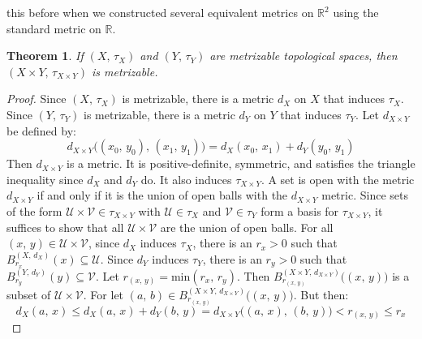 \documentclass{article}
\theoremstyle{plain}
\newtheorem{theorem}{Theorem}[section]
\theoremstyle{normal}
\begin{document}
        this before when we constructed several equivalent metrics on
        $\mathbb{R}^{2}$ using the standard metric on $\mathbb{R}$.
        \begin{theorem}
            If $(X,\,\tau_{X})$ and $(Y,\,\tau_{Y})$ are metrizable topological
            spaces, then $(X\times{Y},\,\tau_{X\times{Y}})$ is metrizable.
        \end{theorem}
        \begin{proof}
            Since $(X,\,\tau_{X})$ is metrizable, there is a metric $d_{X}$
            on $X$ that induces $\tau_{X}$. Since $(Y,\,\tau_{Y})$ is
            metrizable, there is a metric $d_{Y}$ on $Y$ that induces
            $\tau_{Y}$. Let $d_{X\times{Y}}$ be defined by:
            \begin{equation}
                d_{X\times{Y}}\big((x_{0},\,y_{0}),\,(x_{1},\,y_{1})\big)
                =d_{X}(x_{0},\,x_{1})+d_{Y}(y_{0},\,y_{1})
            \end{equation}
            Then $d_{X\times{Y}}$ is a metric. It is positive-definite,
            symmetric, and satisfies the triangle inequality since
            $d_{X}$ and $d_{Y}$ do. It also induces $\tau_{X\times{Y}}$.
            A set is open with the metric $d_{X\times{Y}}$ if and only if
            it is the union of open balls with the
            $d_{X\times{Y}}$ metric. Since sets of the form
            $\mathcal{U}\times\mathcal{V}\in\tau_{X\times{Y}}$ with
            $\mathcal{U}\in\tau_{X}$ and $\mathcal{V}\in\tau_{Y}$ form a basis
            for $\tau_{X\times{Y}}$, it suffices to show that all
            $\mathcal{U}\times\mathcal{V}$ are the union of open balls.
            For all $(x,\,y)\in\mathcal{U}\times\mathcal{V}$, since
            $d_{X}$ induces $\tau_{X}$, there is an $r_{x}>0$ such that
            $B_{r_{x}}^{(X,\,d_{X})}(x)\subseteq\mathcal{U}$. Since
            $d_{Y}$ induces $\tau_{Y}$, there is an $r_{y}>0$ such that
            $B_{r_{y}}^{(Y,\,d_{Y})}(y)\subseteq\mathcal{V}$. Let
            $r_{(x,\,y)}=\textrm{min}(r_{x},\,r_{y})$. Then
            $B_{r_{(x,\,y)}}^{(X\times{Y},\,d_{X\times{Y}})}\big((x,\,y)\big)$
            is a subset of $\mathcal{U}\times\mathcal{V}$. For let
            $(a,\,b)\in{B}_{r_{(x,\,y)}}^{(X\times{Y},\,d_{X\times{Y}})}\big((x,\,y)\big)$.
            But then:
            \begin{equation}
                d_{X}(a,\,x)
                \leq{d}_{X}(a,\,x)+d_{Y}(b,\,y)
                =d_{X\times{Y}}\big((a,\,x),\,(b,\,y)\big)
                <r_{(x,\,y)}\leq{r}_{x}

\end{equation}
\end{proof}
\end{document}
